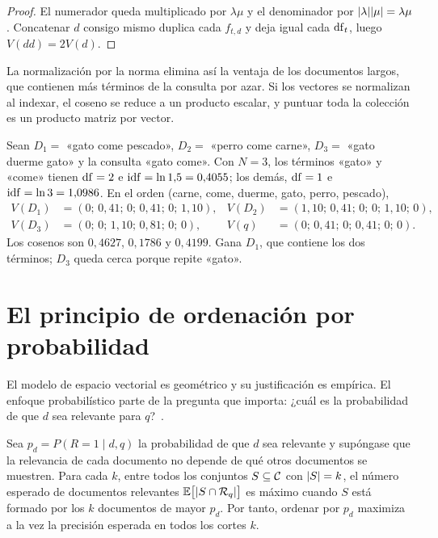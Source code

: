 \begin{proof}
El numerador queda multiplicado por $\lambda\mu$ y el denominador por $\lvert\lambda\rvert\lvert\mu\rvert=\lambda\mu$. Concatenar $d$ consigo mismo duplica cada $f_{t,d}$ y deja igual cada $\operatorname{df}_t$, luego $V(dd)=2V(d)$.
\end{proof}

La normalización por la norma elimina así la ventaja de los documentos largos, que contienen más términos de la consulta por azar. Si los vectores se normalizan al indexar, el coseno se reduce a un producto escalar, y puntuar toda la colección es un producto matriz por vector.

\begin{ejemplo}\label{ej:tfidf}
Sean $D_1=$ «gato come pescado», $D_2=$ «perro come carne», $D_3=$ «gato duerme gato» y la consulta «gato come». Con $N=3$, los términos «gato» y «come» tienen $\operatorname{df}=2$ e $\operatorname{idf}=\ln 1{,}5=0{,}4055$; los demás, $\operatorname{df}=1$ e $\operatorname{idf}=\ln 3=1{,}0986$. En el orden (carne, come, duerme, gato, perro, pescado),
\[
\begin{aligned}
V(D_1)&=(0;\,0{,}41;\,0;\,0{,}41;\,0;\,1{,}10), & V(D_2)&=(1{,}10;\,0{,}41;\,0;\,0;\,1{,}10;\,0),\\
V(D_3)&=(0;\,0;\,1{,}10;\,0{,}81;\,0;\,0), & V(q)&=(0;\,0{,}41;\,0;\,0{,}41;\,0;\,0).
\end{aligned}
\]
Los cosenos son $0{,}4627$, $0{,}1786$ y $0{,}4199$. Gana $D_1$, que contiene los dos términos; $D_3$ queda cerca porque repite «gato».
\end{ejemplo}

\section{El principio de ordenación por probabilidad}

El modelo de espacio vectorial es geométrico y su justificación es empírica. El enfoque probabilístico parte de la pregunta que importa: ¿cuál es la probabilidad de que $d$ sea relevante para $q$?~\cite[§11.2]{iir}.

\begin{teorema}\label{teo:prp}
Sea $p_d=P(R=1\mid d,q)$ la probabilidad de que $d$ sea relevante y supóngase que la relevancia de cada documento no depende de qué otros documentos se muestren. Para cada $k$, entre todos los conjuntos $S\subseteq\mathcal{C}$ con $\lvert S\rvert=k$, el número esperado de documentos relevantes $\mathbb{E}\bigl[\lvert S\cap\mathcal{R}_q\rvert\bigr]$ es máximo cuando $S$ está formado por los $k$ documentos de mayor $p_d$. Por tanto, ordenar por $p_d$ maximiza a la vez la precisión esperada en todos los cortes $k$.
\end{teorema}

